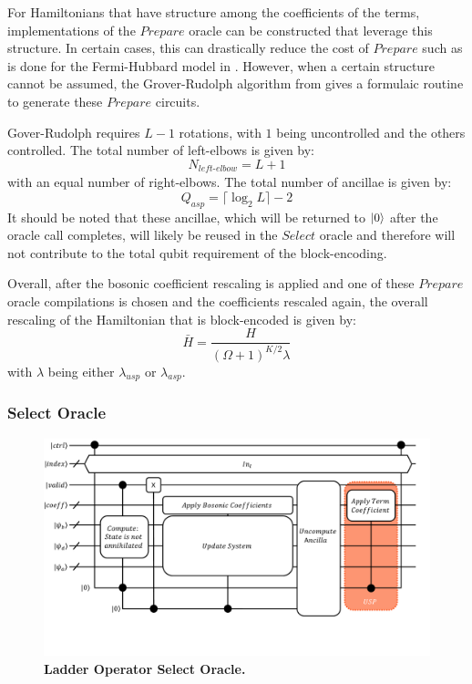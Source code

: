 For Hamiltonians that have structure among the coefficients of the terms, implementations of the $\textit{Prepare}$ oracle can be constructed that leverage this structure.
In certain cases, this can drastically reduce the cost of $\textit{Prepare}$ such as is done for the Fermi-Hubbard model in \cite{babbush2018encoding}.
However, when a certain structure cannot be assumed, the Grover-Rudolph algorithm from \cite{grover2002creating} gives a formulaic routine to generate these $\textit{Prepare}$ circuits.

Gover-Rudolph requires $L-1$ rotations, with $1$ being uncontrolled and the others controlled.
The total number of left-elbows is given by:
\begin{equation}
    N_{\textit{left-elbow}} = L + 1 
\end{equation}
with an equal number of right-elbows.
The total number of ancillae is given by:
\begin{equation}
    Q_{asp} = \lceil \log_2{L} \rceil - 2
\end{equation}
It should be noted that these ancillae, which will be returned to $\ket{0}$ after the oracle call completes, will likely be reused in the $\textit{Select}$ oracle and therefore will not contribute to the total qubit requirement of the block-encoding.

Overall, after the bosonic coefficient rescaling is applied and one of these $Prepare$ oracle compilations is chosen and the coefficients rescaled again, the overall rescaling of the Hamiltonian that is block-encoded is given by:
\begin{equation}
    \bar{H} = \frac{H}{(\Omega + 1)^{K/2} \lambda}
\end{equation}
with $\lambda$ being either $\lambda_{usp}$ or $\lambda_{asp}$.

\subsubsection{Select Oracle}
\label{subsubsec:select}


\begin{figure}
    \centering
    \includegraphics[width=16cm]{figures/select-broad.pdf}
    \caption{\textbf{Ladder Operator Select Oracle.}
    }
    \label{fig:select-broad}
\end{figure}

